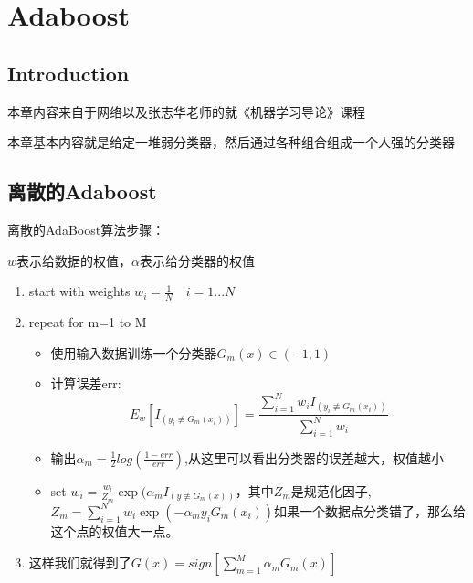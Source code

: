 \chapter{Adaboost}

\section*{Introduction}
	本章内容来自于网络以及张志华老师的就《机器学习导论》课程

	本章基本内容就是给定一堆弱分类器，然后通过各种组合组成一个人强的分类器

\section{离散的Adaboost}

	离散的AdaBoost算法步骤：\boldmath  %

	$w$表示给数据的权值，$\alpha$表示给分类器的权值

	\begin{enumerate}		
		\item start with weights $w_i = \frac{1}{N} \quad i=1...N$
		\item repeat for m=1 to M
			\begin{itemize}
				\item 使用输入数据训练一个分类器$G_m(x) \in (-1,1)$
				\item 计算误差err:
					\begin{equation*}
						E_w[I_(y_i\not \equiv G_m(x_i))]=\frac{\sum_{i=1}^{N}w_i I_(y_i\not \equiv G_m(x_i))}{\sum_{i=1}^{N}w_i}
					\end{equation*}
				\item 输出$\alpha_m = \frac{1}{2}log(\frac{1-err}{err})$,从这里可以看出分类器的误差越大，权值越小
				\item set $w_i = \frac{w_i}{Z_m} \exp(\alpha_m I_(y\not \equiv G_m(x))$，其中$Z_m$是规范化因子,\newline
				$Z_m=\sum_{i=1}^{N}w_i \exp(-\alpha_m y_i G_m(x_i))$如果一个数据点分类错了，那么给这个点的权值大一点。
			\end{itemize}
		\item 这样我们就得到了$G(x)=sign[\sum_{m=1}^{M}\alpha_m G_m(x)]$
	\end{enumerate}




